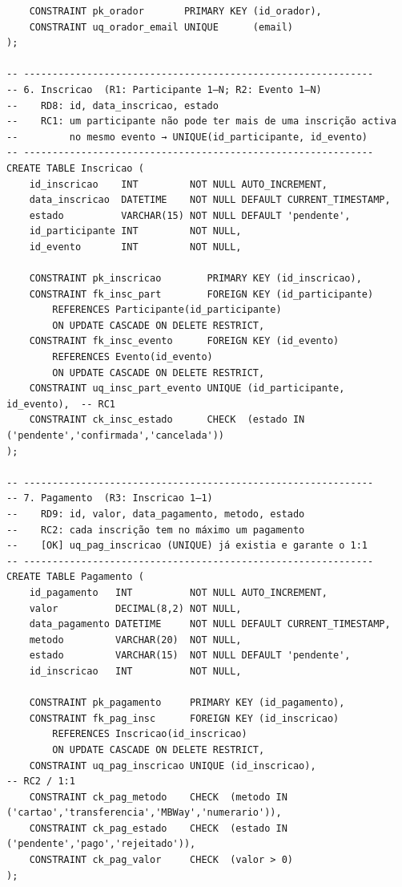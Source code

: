 \documentclass[runningheads]{llncs}
\begin{document}
\begin{small}
\begin{verbatim}
    CONSTRAINT pk_orador       PRIMARY KEY (id_orador),
    CONSTRAINT uq_orador_email UNIQUE      (email)
);

-- -------------------------------------------------------------
-- 6. Inscricao  (R1: Participante 1—N; R2: Evento 1—N)
--    RD8: id, data_inscricao, estado
--    RC1: um participante não pode ter mais de uma inscrição activa
--         no mesmo evento → UNIQUE(id_participante, id_evento)
-- -------------------------------------------------------------
CREATE TABLE Inscricao (
    id_inscricao    INT         NOT NULL AUTO_INCREMENT,
    data_inscricao  DATETIME    NOT NULL DEFAULT CURRENT_TIMESTAMP,
    estado          VARCHAR(15) NOT NULL DEFAULT 'pendente',
    id_participante INT         NOT NULL,
    id_evento       INT         NOT NULL,

    CONSTRAINT pk_inscricao        PRIMARY KEY (id_inscricao),
    CONSTRAINT fk_insc_part        FOREIGN KEY (id_participante)
        REFERENCES Participante(id_participante)
        ON UPDATE CASCADE ON DELETE RESTRICT,
    CONSTRAINT fk_insc_evento      FOREIGN KEY (id_evento)
        REFERENCES Evento(id_evento)
        ON UPDATE CASCADE ON DELETE RESTRICT,
    CONSTRAINT uq_insc_part_evento UNIQUE (id_participante, id_evento),  -- RC1
    CONSTRAINT ck_insc_estado      CHECK  (estado IN ('pendente','confirmada','cancelada'))
);

-- -------------------------------------------------------------
-- 7. Pagamento  (R3: Inscricao 1—1)
--    RD9: id, valor, data_pagamento, metodo, estado
--    RC2: cada inscrição tem no máximo um pagamento
--    [OK] uq_pag_inscricao (UNIQUE) já existia e garante o 1:1
-- -------------------------------------------------------------
CREATE TABLE Pagamento (
    id_pagamento   INT          NOT NULL AUTO_INCREMENT,
    valor          DECIMAL(8,2) NOT NULL,
    data_pagamento DATETIME     NOT NULL DEFAULT CURRENT_TIMESTAMP,
    metodo         VARCHAR(20)  NOT NULL,
    estado         VARCHAR(15)  NOT NULL DEFAULT 'pendente',
    id_inscricao   INT          NOT NULL,

    CONSTRAINT pk_pagamento     PRIMARY KEY (id_pagamento),
    CONSTRAINT fk_pag_insc      FOREIGN KEY (id_inscricao)
        REFERENCES Inscricao(id_inscricao)
        ON UPDATE CASCADE ON DELETE RESTRICT,
    CONSTRAINT uq_pag_inscricao UNIQUE (id_inscricao),                    -- RC2 / 1:1
    CONSTRAINT ck_pag_metodo    CHECK  (metodo IN ('cartao','transferencia','MBWay','numerario')),
    CONSTRAINT ck_pag_estado    CHECK  (estado IN ('pendente','pago','rejeitado')),
    CONSTRAINT ck_pag_valor     CHECK  (valor > 0)
);


\end{verbatim}
\end{small}
\end{document}
